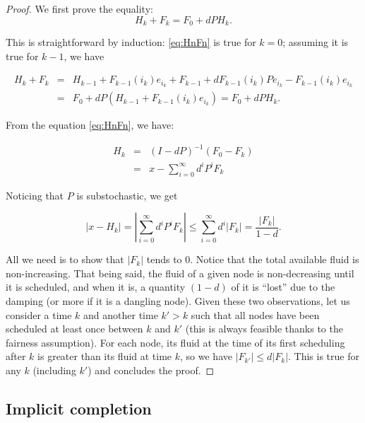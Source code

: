 \documentclass{llncs}
\begin{document}
\begin{proof}

We first prove the equality:
\begin{equation}\label{eq:HnFn}
H_k + F_k = F_0 + d P H_k.
\end{equation}

This is straightforward by induction:  \eqref{eq:HnFn} is true for $ k=0 $; assuming it is true for $k-1$, we have

$$
\begin{array}{lcl} 
H_{k} + F_{k} &=&
H_{k-1}+F_{k-1}(i_k)e_{i_k}+F_{k-1} + d F_{k-1}(i_k) P e_{i_k} - F_{k-1}(i_k)e_{i_k}\\
&=& F_0 + d P (H_{k-1}+  F_{k-1}(i_k)e_{i_k})=F_0 + d P H_k.
\end{array}
$$

From the equation \ref{eq:HnFn}, we have:

$$
\begin{array}{lcl}
H_k &=& (I-dP)^{-1}(F_0-F_k)\\
&=&  x - \sum_{i=0}^{\infty}d^iP^iF_k 
\end{array}
$$

Noticing that $ P $ is substochastic, we get 

$$
|x - H_k|=|\sum_{i=0}^{\infty}d^iP^iF_k|\leq \sum_{i=0}^{\infty}d^i|F_k|=\frac{|F_k|}{1-d}\text{.}
$$

All we need is to show that $|F_k|$ tends to 0. Notice that the total available fluid is non-increasing. That being said, the fluid of a given node is non-decreasing until it is scheduled, and when it is, a quantity $ (1-d) $ of it is ``lost'' due to the damping (or more if it is a dangling node). Given these two observations, let us consider a time $ k $ and another time $ k'>k $ such that all nodes have been scheduled at least once between $ k $ and $ k' $ (this is always feasible thanks to the fairness assumption). For each node, its fluid at the time of its first scheduling after $ k $ is greater than its fluid at time $ k $, so we have $|F_{k'}|\leq d |F_k|$. This is true for any $ k $ (including $ k' $) and concludes the proof.
\end{proof}



\subsection{Implicit completion}



\label{ss:distance}
\end{document}
